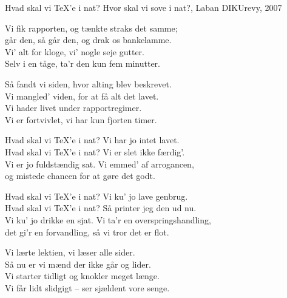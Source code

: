 \begin{song}{Hvad skal vi \TeX'e i nat?}
  {} %
  {Hvor skal vi sove i nat?, Laban} %
  {} %
  {DIKUrevy, 2007} %
  {\NotCCLIed} %

  \begin{SBVerse}
    Vi fik rapporten, og tænkte straks det samme;\\
    går den, så går den, og drak os bankelamme.\\
    Vi' alt for kloge, vi' nogle seje gutter.\\
    Selv i en tåge, ta'r den kun fem minutter.
  \end{SBVerse}

  \begin{SBVerse}
    Så fandt vi siden, hvor alting blev beskrevet.\\
    Vi mangled' viden, for at få alt det lavet.\\
    Vi hader livet under rapportregimer.\\
    Vi er fortvivlet, vi har kun fjorten timer.
  \end{SBVerse}

  \begin{SBChorus}
    Hvad skal vi \TeX'e i nat? Vi har jo intet lavet.\\
    Hvad skal vi \TeX'e i nat? Vi er slet ikke færdig'.\\
    Vi er jo fuldstændig sat. Vi emmed' af arrogancen,\\
    og mistede chancen for at gøre det godt.
  \end{SBChorus}

  \begin{SBChorus}
    Hvad skal vi \TeX'e i nat? Vi ku' jo lave genbrug.\\
    Hvad skal vi \TeX'e i nat? Så printer jeg den ud nu.\\
    Vi ku' jo drikke en sjat. Vi ta'r en overspringshandling,\\
    det gi'r en forvandling, så vi tror det er flot.
  \end{SBChorus}

  \begin{SBVerse}
    Vi lærte lektien, vi læser alle sider.\\
    Så nu er vi mænd der ikke går og lider.\\
    Vi starter tidligt og knokler meget længe.\\
    Vi får lidt slidgigt -- ser sjældent vore senge.
  \end{SBVerse}


\end{song}
